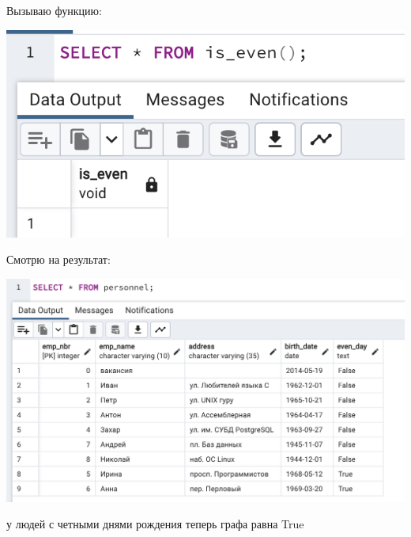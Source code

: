 \documentclass[a4paper,12pt]{article}
\begin{document}
Вызываю функцию:
\begin{flushleft}
\includegraphics[scale=0.6]{18_4.png}
\end{flushleft}
Смотрю на результат:
\begin{flushleft}
\includegraphics[scale=0.6]{18_5.png}
\end{flushleft}
у людей с четными днями рождения теперь графа равна True
\end{document}
